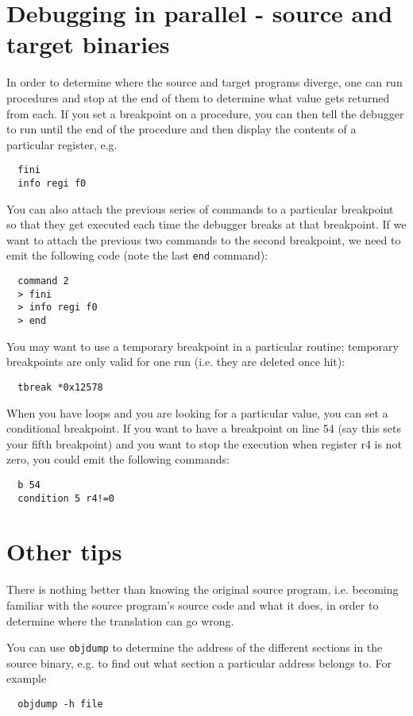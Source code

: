 \section{Debugging in parallel - source and target binaries}
In order to determine where the source and target programs diverge, one 
can run procedures and stop at the end of them to determine what value
gets returned from each.  If you set a breakpoint on a procedure, you  
can then tell the debugger to run until the end of the procedure and then
display the contents of a particular register, e.g.
\begin{verbatim}
  fini
  info regi f0
\end{verbatim}

You can also attach the previous series of commands to a particular 
breakpoint so that they get executed each time the debugger breaks 
at that breakpoint.  If we want to attach the previous two commands 
to the second breakpoint, we need to emit the following code (note 
the last \verb!end! command): 
\begin{verbatim}
  command 2
  > fini
  > info regi f0
  > end
\end{verbatim}

You may want to use a temporary breakpoint in a particular routine; 
temporary breakpoints are only valid for one run (i.e. they are 
deleted once hit): 
\begin{verbatim}
  tbreak *0x12578
\end{verbatim}

When you have loops and you are looking for a particular value, 
you can set a conditional breakpoint.  If you want to have a 
breakpoint on line 54 (say this sets your fifth breakpoint) and 
you want to stop the execution when register r4 is not zero, 
you could emit the following commands: 
\begin{verbatim}
  b 54
  condition 5 r4!=0
\end{verbatim}



\section{Other tips}
There is nothing better than knowing the original source program,
i.e. becoming familiar with the source program's source code and 
what it does, in order to determine where the translation can go 
wrong.  

You can use \verb!objdump! to determine the address of the different 
sections in the source binary, e.g. to find out what section a 
particular address belongs to.  For example
\begin{verbatim}
  objdump -h file
\end{verbatim}

